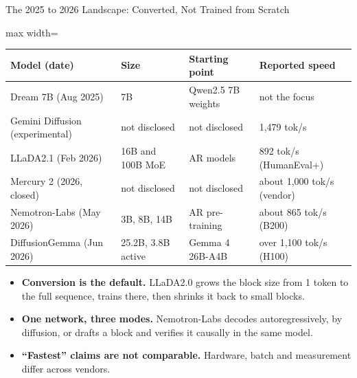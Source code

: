 \begin{frame}{The 2025 to 2026 Landscape: Converted, Not Trained from Scratch}
    \begin{center}
    \footnotesize
    \renewcommand{\arraystretch}{1.04}
    \begin{adjustbox}{max width=\linewidth}\begin{tabular}{llll}
        \toprule
        \textbf{Model (date)} & \textbf{Size} & \textbf{Starting point} & \textbf{Reported speed} \\
        \midrule
        Dream 7B (Aug 2025) & 7B & Qwen2.5 7B weights & not the focus \\
        Gemini Diffusion (experimental) & not disclosed & not disclosed & 1,479 tok/s \\
        LLaDA2.1 (Feb 2026) & 16B and 100B MoE & AR models & 892 tok/s (HumanEval+) \\
        Mercury 2 (2026, closed) & not disclosed & not disclosed & about 1,000 tok/s (vendor) \\
        Nemotron-Labs (May 2026) & 3B, 8B, 14B & AR pre-training & about 865 tok/s (B200) \\
        \rowcolor{KAUSTcyan!12} DiffusionGemma (Jun 2026) & 25.2B, 3.8B active & Gemma 4 26B-A4B & over 1,100 tok/s (H100) \\
        \bottomrule
    \end{tabular}\end{adjustbox}
    \end{center}
    \begin{itemize}\itemsep0.4em
        \item \textbf{Conversion is the default.} LLaDA2.0 grows the block size from 1 token to the full sequence, trains there, then shrinks it back to small blocks.
        \item \textbf{One network, three modes.} Nemotron-Labs decodes autoregressively, by diffusion, or drafts a block and verifies it causally in the same model.
        \item \textbf{``Fastest'' claims are not comparable.} Hardware, batch and measurement differ across vendors.
    \end{itemize}
\end{frame}

